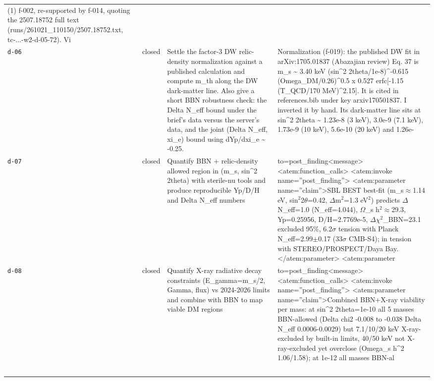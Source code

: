 \documentclass[11pt,a4paper]{article}
\begin{document}
\begin{longtable}{@{}p{}p{}p{}p{}@{}}
(1) f-002, re-supported by f-014, quoting the 2507.18752 full text (runs/261021\_110150/2507.18752.txt, tc-...-w2-d-05-72). Vi \\
\texttt{d-06} & closed & Settle the factor-3 DW relic-density normalization against a published calculation and compute m\_th along the DW dark-matter line. Also give a short BBN robustness check: the Delta N\_eff bound under the brief's data versus the server's data, and the joint (Delta N\_eff, xi\_e) bound using dYp/dxi\_e \textasciitilde{} -0.25. & Normalization (f-019): the published DW fit in arXiv:1705.01837 (Abazajian review) Eq. 37 is m\_s \textasciitilde{} 3.40 keV (sin\textasciicircum{}2 2theta/1e-8)\textasciicircum{}-0.615 (Omega\_DM/0.26)\textasciicircum{}0.5 x 0.527 erfc[-1.15 (T\_QCD/170 MeV)\textasciicircum{}2.15]. It is cited in references.bib under key arxiv170501837. I inverted it by hand. Its dark-matter line sits at sin\textasciicircum{}2 2theta \textasciitilde{} 1.23e-8 (3 keV), 3.0e-9 (7.1 keV), 1.73e-9 (10 keV), 5.6e-10 (20 keV) and 1.26e- \\
\texttt{d-07} & closed & Quantify BBN + relic-density allowed region in (m\_s, sin\textasciicircum{}2 2theta) with sterile-nu tools and produce reproducible Yp/D/H and Delta N\_eff numbers & to=post\_finding\textless{}\textbar{}message\textbar{}\textgreater{}\textless{}atem:function\_calls\textgreater{}
\textless{}atem:invoke name=''post\_finding''\textgreater{}
\textless{}atem:parameter name=''claim''\textgreater{}SBL BEST best-fit (m\_s$\approx$1.14 eV, sin$^2$2$\theta$=0.42, $\Delta$m$^2$=1.3 eV$^2$) predicts $\Delta$N\_eff=1.0 (N\_eff=4.044), $\Omega$\_s h$^2$$\approx$29.3, Yp=0.25956, D/H=2.7769e-5, $\Delta$$\chi$$^2$\_BBN=23.1 excluded 95\%, 6.2$\sigma$ tension with Planck N\_eff=2.99$\pm$0.17 (33$\sigma$ CMB-S4); in tension with STEREO/PROSPECT/Daya Bay.\textless{}/atem:parameter\textgreater{}
\textless{}atem:parameter \\
\texttt{d-08} & closed & Quantify X-ray radiative decay constraints (E\_gamma=m\_s/2, Gamma, flux) vs 2024-2026 limits and combine with BBN to map viable DM regions & to=post\_finding\textless{}\textbar{}message\textbar{}\textgreater{}\textless{}atem:function\_calls\textgreater{}
\textless{}atem:invoke name=''post\_finding''\textgreater{}
\textless{}atem:parameter name=''claim''\textgreater{}Combined BBN+X-ray viability per mass: at sin\textasciicircum{}2 2theta=1e-10 all 5 masses BBN-allowed (Delta chi2 -0.008 to -0.038 Delta N\_eff 0.0006-0.0029) but 7.1/10/20 keV X-ray-excluded by built-in limits, 40/50 keV not X-ray-excluded yet overclose (Omega\_s h\textasciicircum{}2 1.06/1.58); at 1e-12 all masses BBN-al \\
$$
\end{longtable}
\end{document}
